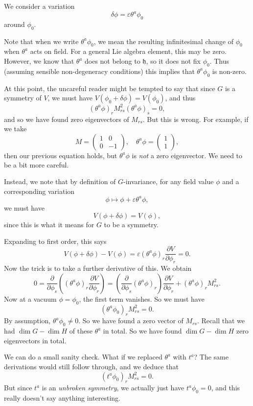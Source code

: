\documentclass[a4paper]{article}
\begin{document}
We consider a variation
\[
  \delta \phi = \varepsilon \theta^a \phi_0
\]
around $\phi_0$.

Note that when we write $\theta^a \phi_0$, we mean the resulting infinitesimal change of $\phi_0$ when $\theta^a$ acts on field. For a general Lie algebra element, this may be zero. However, we know that $\theta^a$ does not belong to $\mathfrak{h}$, so it does not fix $\phi_0$. Thus (assuming sensible non-degeneracy conditions) this implies that $\theta^a \phi_0$ is non-zero.

At this point, the uncareful reader might be tempted to say that since $G$ is a symmetry of $V$, we must have $V(\phi_0 + \delta \phi) = V(\phi_0)$, and thus
\[
  (\theta^a \phi)_r M_{rs}^2  (\theta^a \phi)_s = 0,
\]
and so we have found zero eigenvectors of $M_{rs}$. But this is wrong. For example, if we take
\[
  M = 
  \begin{pmatrix}
    1 & 0\\
    0 & -1
  \end{pmatrix},\quad 
  \theta^a \phi = 
  \begin{pmatrix}
    1\\1
  \end{pmatrix},
\]
then our previous equation holds, but $\theta^a \phi$ is \emph{not} a zero eigenvector. We need to be a bit more careful.

Instead, we note that by definition of $G$-invariance, for any field value $\phi$ and a corresponding variation
\[
  \phi \mapsto \phi + \varepsilon \theta^a \phi,
\]
we must have
\[
  V(\phi + \delta \phi) = V(\phi),
\]
since this is what it means for $G$ to be a symmetry.

Expanding to first order, this says
\[
  V(\phi + \delta \phi) - V(\phi) = \varepsilon (\theta^a \phi)_r \frac{\partial V}{\partial \phi_r} = 0.
\]
Now the trick is to take a further derivative of this. We obtain
\[
  0 = \frac{\partial}{\partial \phi_s} \left((\theta^a \phi)_r \frac{\partial V}{\partial \phi_r}\right) = \left(\frac{\partial}{\partial \phi_s} (\theta^a \phi)_r\right) \frac{\partial V}{\partial \phi_r} + (\theta^a \phi)_r M_{rs}^2.
\]
Now at a vacuum $\phi = \phi_0$, the first term vanishes. So we must have
\[
  (\theta^a \phi_0)_r M_{rs}^2 = 0.
\]
By assumption, $\theta^a \phi_0 \not= 0$. So we have found a zero vector of $M_{rs}$. Recall that we had $\dim G - \dim H$ of these $\theta^a$ in total. So we have found $\dim G - \dim H$ zero eigenvectors in total.

We can do a small sanity check. What if we replaced $\theta^a$ with $t^a$? The same derivations would still follow through, and we deduce that
\[
  (t^a \phi_0)_r M_{rs}^2 = 0.
\]
But since $t^a$ is an \emph{unbroken symmetry}, we actually just have $t^a \phi_0 = 0$, and this really doesn't say anything interesting.
\end{document}
